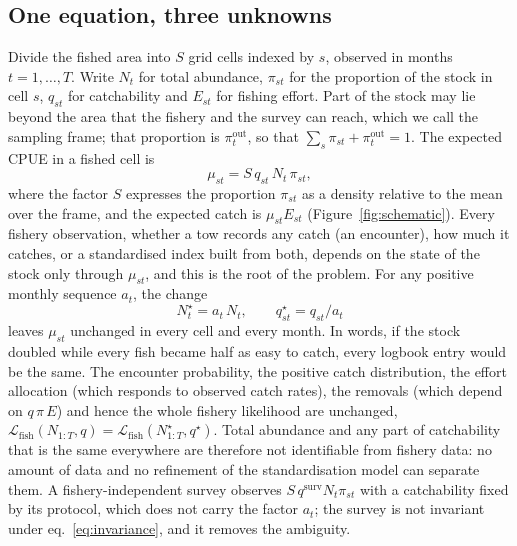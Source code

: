 \documentclass[11pt,a4paper]{article}
\newcommand{\vt}[1]{\text{#1}}
\begin{document}
\subsection{One equation, three unknowns}
\label{sec:invariance}

Divide the fished area into $S$ grid cells indexed by $s$, observed in months $t=1,\dots,T$. Write $N_t$ for total abundance, $\pi_{st}$ for the proportion of the stock in cell $s$, $q_{st}$ for catchability and $E_{st}$ for fishing effort. Part of the stock may lie beyond the area that the fishery and the survey can reach, which we call the sampling frame; that proportion is $\pi^{\vt{out}}_t$, so that $\sum_s \pi_{st} + \pi^{\vt{out}}_t = 1$. The expected CPUE in a fished cell is
\begin{equation}
\mu_{st} = S\,q_{st}\,N_t\,\pi_{st},
\label{eq:mu}
\end{equation}
where the factor $S$ expresses the proportion $\pi_{st}$ as a density relative to the mean over the frame, and the expected catch is $\mu_{st}E_{st}$ (Figure~\ref{fig:schematic}). Every fishery observation, whether a tow records any catch (an encounter), how much it catches, or a standardised index built from both, depends on the state of the stock only through $\mu_{st}$, and this is the root of the problem. For any positive monthly sequence $a_t$, the change
\begin{equation}
N_t^{\star} = a_t\,N_t, \qquad q_{st}^{\star} = q_{st}/a_t
\label{eq:invariance}
\end{equation}
leaves $\mu_{st}$ unchanged in every cell and every month. In words, if the stock doubled while every fish became half as easy to catch, every logbook entry would be the same. The encounter probability, the positive catch distribution, the effort allocation (which responds to observed catch rates), the removals (which depend on $q\,\pi\,E$) and hence the whole fishery likelihood are unchanged, $\mathcal{L}_{\vt{fish}}(N_{1:T}, q) = \mathcal{L}_{\vt{fish}}(N^{\star}_{1:T}, q^{\star})$. Total abundance and any part of catchability that is the same everywhere are therefore not identifiable from fishery data: no amount of data and no refinement of the standardisation model can separate them. A fishery-independent survey observes $S\,q^{\vt{surv}}N_t\pi_{st}$ with a catchability fixed by its protocol, which does not carry the factor $a_t$; the survey is not invariant under eq.~\eqref{eq:invariance}, and it removes the ambiguity.
\end{document}

